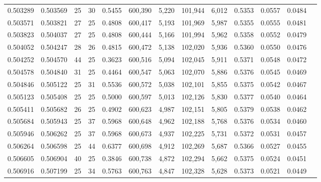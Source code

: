 \begin{tabular}{rrrrrrrrrrrrr}
0.503289 & 0.503569 &    25 &  30 &                                     0.5455 & 600,390 &   5,220 & 101,944 &   6,012 & 0.5353 & 0.0557 & 0.0484 \\
0.503571 & 0.503821 &    27 &  25 &                                     0.4808 & 600,417 &   5,193 & 101,969 &   5,987 & 0.5355 & 0.0555 & 0.0481 \\
0.503823 & 0.504037 &    27 &  25 &                                     0.4808 & 600,444 &   5,166 & 101,994 &   5,962 & 0.5358 & 0.0552 & 0.0479 \\
0.504052 & 0.504247 &    28 &  26 &                                     0.4815 & 600,472 &   5,138 & 102,020 &   5,936 & 0.5360 & 0.0550 & 0.0476 \\
0.504252 & 0.504570 &    44 &  25 &                                     0.3623 & 600,516 &   5,094 & 102,045 &   5,911 & 0.5371 & 0.0548 & 0.0472 \\
0.504578 & 0.504840 &    31 &  25 &                                     0.4464 & 600,547 &   5,063 & 102,070 &   5,886 & 0.5376 & 0.0545 & 0.0469 \\
0.504846 & 0.505122 &    25 &  31 &                                     0.5536 & 600,572 &   5,038 & 102,101 &   5,855 & 0.5375 & 0.0542 & 0.0467 \\
0.505123 & 0.505408 &    25 &  25 &                                     0.5000 & 600,597 &   5,013 & 102,126 &   5,830 & 0.5377 & 0.0540 & 0.0464 \\
0.505411 & 0.505682 &    26 &  25 &                                     0.4902 & 600,623 &   4,987 & 102,151 &   5,805 & 0.5379 & 0.0538 & 0.0462 \\
0.505684 & 0.505943 &    25 &  37 &                                     0.5968 & 600,648 &   4,962 & 102,188 &   5,768 & 0.5376 & 0.0534 & 0.0460 \\
0.505946 & 0.506262 &    25 &  37 &                                     0.5968 & 600,673 &   4,937 & 102,225 &   5,731 & 0.5372 & 0.0531 & 0.0457 \\
0.506264 & 0.506598 &    25 &  44 &                                     0.6377 & 600,698 &   4,912 & 102,269 &   5,687 & 0.5366 & 0.0527 & 0.0455 \\
0.506605 & 0.506904 &    40 &  25 &                                     0.3846 & 600,738 &   4,872 & 102,294 &   5,662 & 0.5375 & 0.0524 & 0.0451 \\
0.506916 & 0.507199 &    25 &  34 &                                     0.5763 & 600,763 &   4,847 & 102,328 &   5,628 & 0.5373 & 0.0521 & 0.0449 \\

\end{tabular}
